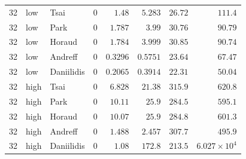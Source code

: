 \begin{longtable}{rllrrrrr}
32 & low & Tsai & 0 & $1.48$ & $5.283$ & $26.72$ & $111.4$ \\
32 & low & Park & 0 & $1.787$ & $3.99$ & $30.76$ & $90.79$ \\
32 & low & Horaud & 0 & $1.784$ & $3.999$ & $30.85$ & $90.74$ \\
32 & low & Andreff & 0 & $0.3296$ & $0.5751$ & $23.64$ & $67.47$ \\
32 & low & Daniilidis & 0 & $0.2065$ & $0.3914$ & $22.31$ & $50.04$ \\
32 & high & Tsai & 0 & $6.828$ & $21.38$ & $315.9$ & $620.8$ \\
32 & high & Park & 0 & $10.11$ & $25.9$ & $284.5$ & $595.1$ \\
32 & high & Horaud & 0 & $10.07$ & $25.9$ & $284.8$ & $601.3$ \\
32 & high & Andreff & 0 & $1.488$ & $2.457$ & $307.7$ & $495.9$ \\
32 & high & Daniilidis & 0 & $1.08$ & $172.8$ & $213.5$ & $6.027\times10^{4}$ \\
\end{longtable}
\endgroup
